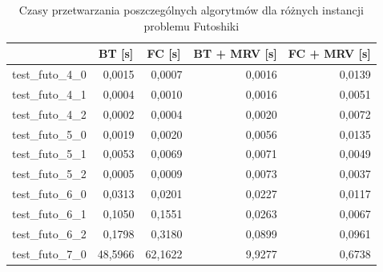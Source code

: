 \documentclass{article}
\begin{document}
	\begin{table}[H]
		\caption{Czasy przetwarzania poszczególnych algorytmów dla różnych instancji problemu Futoshiki}
		\label{tab:times_futo}
		\begin{center}
			\begin{tabular}{|l|r|r|r|r|}
				\hline
				& \multicolumn{1}{c|}{\textbf{BT [s]}} & \multicolumn{1}{c|}{\textbf{FC [s]}} & \multicolumn{1}{c|}{\textbf{BT + MRV [s]}} & \multicolumn{1}{c|}{\textbf{FC + MRV [s]}} \\ \hline
				test\_futo\_4\_0 & 0,0015                           & 0,0007                           & 0,0016                                 & 0,0139                                 \\ \hline
				test\_futo\_4\_1 & 0,0004                           & 0,0010                           & 0,0016                                 & 0,0051                                 \\ \hline
				test\_futo\_4\_2 & 0,0002                           & 0,0004                           & 0,0020                                 & 0,0072                                 \\ \hline
				test\_futo\_5\_0 & 0,0019                           & 0,0020                           & 0,0056                                 & 0,0135                                 \\ \hline
				test\_futo\_5\_1 & 0,0053                           & 0,0069                           & 0,0071                                 & 0,0049                                 \\ \hline
				test\_futo\_5\_2 & 0,0005                           & 0,0009                           & 0,0073                                 & 0,0037                                 \\ \hline
				test\_futo\_6\_0 & 0,0313                           & 0,0201                           & 0,0227                                 & 0,0117                                 \\ \hline
				test\_futo\_6\_1 & 0,1050                           & 0,1551                           & 0,0263                                 & 0,0067                                 \\ \hline
				test\_futo\_6\_2 & 0,1798                           & 0,3180                           & 0,0899                                 & 0,0961                                 \\ \hline
				test\_futo\_7\_0 & 48,5966                          & 62,1622                          & 9,9277                                 & 0,6738                                 \\ \hline

\end{tabular}
\end{center}
\end{table}
\end{document}
